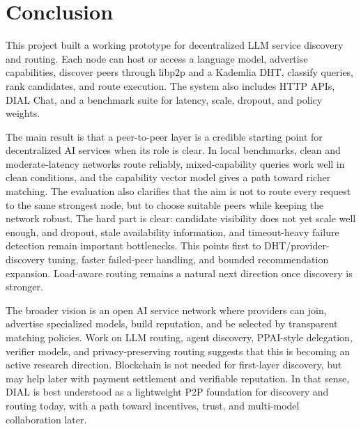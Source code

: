 \section{Conclusion}

This project built a working prototype for decentralized LLM service discovery
and routing. Each node can host or access a language model, advertise
capabilities, discover peers through libp2p and a Kademlia DHT, classify
queries, rank candidates, and route execution. The system also includes HTTP
APIs, DIAL Chat, and a benchmark suite for latency, scale, dropout, and policy
weights.

The main result is that a peer-to-peer layer is a credible starting point
for decentralized AI services when its role is clear. In local benchmarks,
clean and moderate-latency networks route reliably, mixed-capability queries
work well in clean conditions, and the capability vector model gives a path
toward richer matching. The evaluation also clarifies that the aim is not to
route every request to the same strongest node, but to choose suitable peers
while keeping the network robust. The hard part is clear: candidate visibility
does not yet scale well enough, and dropout, stale availability information,
and timeout-heavy failure detection remain important bottlenecks. This points
first to DHT/provider-discovery tuning, faster failed-peer handling, and
bounded recommendation expansion. Load-aware routing remains a natural next
direction once discovery is stronger.

The broader vision is an open AI service network where providers can join,
advertise specialized models, build reputation, and be selected by transparent
matching policies. Work on LLM routing, agent discovery, PPAI-style delegation,
verifier models, and privacy-preserving routing suggests that this is becoming
an active research direction. Blockchain is not needed for first-layer
discovery, but may help later with payment settlement and verifiable
reputation. In that sense, DIAL is best understood as a lightweight P2P
foundation for discovery and routing today, with a path toward incentives,
trust, and multi-model collaboration later.
